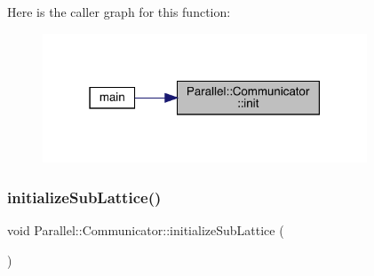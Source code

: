 Here is the caller graph for this function\+:\nopagebreak
\begin{figure}[H]
\begin{center}
\leavevmode
\includegraphics[width=274pt]{class_parallel_1_1_communicator_adc9248c5a0defbbf55bfca988bfd9e96_icgraph}
\end{center}
\end{figure}
\mbox{\label{class_parallel_1_1_communicator_a71baca622b377e6537799857be416a77}} 
\subsubsection{\texorpdfstring{initializeSubLattice()}{initializeSubLattice()}}
{\footnotesize\ttfamily void Parallel\+::\+Communicator\+::initialize\+Sub\+Lattice (\begin{DoxyParamCaption}{ }\end{DoxyParamCaption})\hspace{0.3cm}{\ttfamily [static]}}

